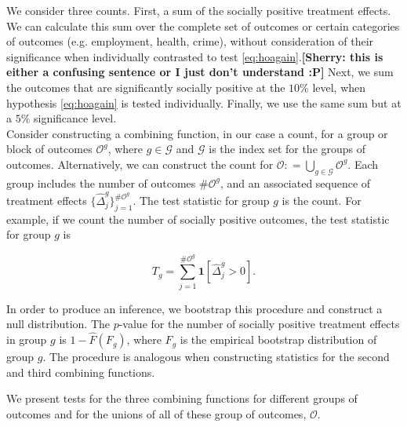 \noindent We consider three counts. First, a sum of the socially positive treatment effects. We can calculate this sum over the complete set of outcomes or certain categories of outcomes (e.g. employment, health, crime), without consideration of their significance when individually contrasted to test \eqref{eq:hoagain}.\textbf{[Sherry: this is either a confusing sentence or I just don't understand :P]} Next, we sum the outcomes that are significantly socially positive at the $10\%$ level, when hypothesis \eqref{eq:hoagain} is tested individually. Finally, we use the same sum but at a $5\%$ significance level.\\

\noindent Consider constructing a combining function, in our case a count, for a group or block of outcomes $\mathcal{O}^g$, where $g \in \mathcal{G}$ and $\mathcal{G}$ is the index set for the groups of outcomes. Alternatively, we can construct the count for $\mathcal{O} : =  \bigcup \limits _{g \in \mathcal{G}} \mathcal{O}^g$. Each group includes the number of outcomes $\# \mathcal{O}^g$, and an associated sequence of treatment effects $\{ \widehat{\Delta}_{j}^{g} \}_{j = 1}^{\# \mathcal{O}^g}$. The test statistic for group $g$ is the count. For example, if we count the number of socially positive outcomes, the test statistic for group $g$ is 

\begin{equation}
T_{g} = \sum _{j=1}^{\# \mathcal{O}^g} \mathbf{1} \left[ \widehat{\Delta}_{j}^{g} > 0\right]. 
\end{equation} 

\noindent In order to produce an inference, we bootstrap this procedure and construct a null distribution. The $p$-value for the number of socially positive treatment effects in group $g$ is $1 - \widehat{F} \left( F_{g} \right)$, where $ F_{g}$ is the empirical bootstrap distribution of group $g$. The procedure is analogous when constructing statistics for the second and third combining functions.

\noindent We present tests for the three combining functions for different groups of outcomes and for the unions of all of these group of outcomes, $\mathcal{O}$.

\clearpage
\singlespace



 
\clearpage
\singlespace



 